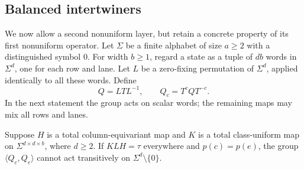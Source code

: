 \subsection{Balanced intertwiners}

We now allow a second nonuniform layer, but retain a concrete property
of its first nonuniform operator.  Let $\Sigma$ be a finite alphabet of
size $a\ge2$ with a distinguished symbol $0$.  For width $b\ge1$, regard
a state as a tuple of $db$ words in $\Sigma^d$, one for each row and lane.
Let $L$ be a zero-fixing permutation of $\Sigma^d$, applied identically
to all these words.  Define
\[
 Q=LTL^{-1},\qquad Q_c=T^cQT^{-c}.
\]
In the next statement the group acts on scalar words; the remaining
maps may mix all rows and lanes.

\begin{theorem}
\label{thm:balanced-pair}
Suppose $H$ is a total column-equivariant map and $K$ is a total
class-uniform map on $\Sigma^{d\times d\times b}$, where $d\ge2$.
If $KLH=\tau$ everywhere and $p(c)=p(e)$, the group
$\langle Q_c,Q_e\rangle$ cannot act transitively on
$\Sigma^d\setminus\{0\}$.
\end{theorem}
